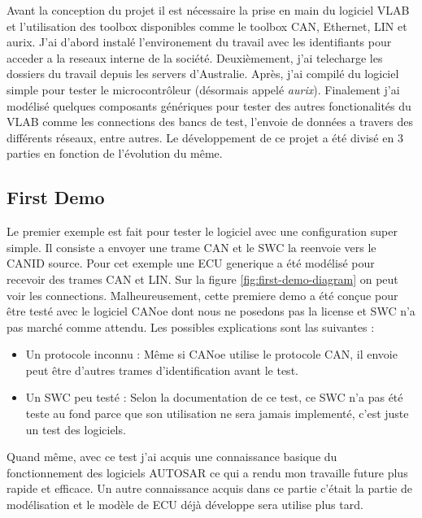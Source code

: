 Avant la conception du projet il est nécessaire la prise en main du logiciel VLAB et l'utilisation des toolbox disponibles comme le toolbox CAN, Ethernet, LIN et aurix. J'ai d'abord instal\'e l'environement du travail avec les identifiants pour acceder a la reseaux interne de la soci\'et\'e. Deuxièmement, j'ai telecharge les dossiers du travail depuis les servers d'Australie. Apr\`es, j'ai compil\'e du logiciel simple pour tester le microcontr\^oleur (désormais appel\'e \textit{aurix}). Finalement j'ai mod\'elis\'e quelques composants génériques pour tester des autres fonctionalit\'es du VLAB comme les connections des bancs de test, l'envoie de donn\'ees a travers des différents réseaux, entre autres. Le développement de ce projet a \'et\'e divis\'e en 3 parties en fonction de l'évolution du même.

\subsection{First Demo}

Le premier exemple est fait pour tester le logiciel avec une configuration super simple. Il consiste a envoyer une trame CAN et le SWC la reenvoie vers le CANID source. Pour cet exemple une ECU generique a \'et\'e modélisé pour recevoir des trames CAN et LIN. Sur la figure \ref{fig:first-demo-diagram} on peut voir les connections. Malheureusement, cette premiere demo a \'et\'e con\c cue pour \^etre test\'e avec le logiciel CANoe dont nous ne posedons pas la license et SWC n'a pas march\'e comme attendu. Les possibles explications sont las suivantes :

\begin{itemize}
    \item Un protocole inconnu : Même si CANoe utilise le protocole CAN, il envoie peut \^etre d'autres trames d'identification avant le test.
    \item Un SWC peu test\'e : Selon la documentation de ce test, ce SWC n'a pas \'et\'e teste au fond parce que son utilisation ne sera jamais implement\'e, c'est juste un test des logiciels.
\end{itemize}

Quand même, avec ce test j'ai acquis une connaissance basique du fonctionnement des logiciels AUTOSAR ce qui a rendu mon travaille future plus rapide et efficace. Un autre connaissance acquis dans ce partie c'était la partie de modélisation et le modèle de ECU déjà développe sera utilise plus tard.



